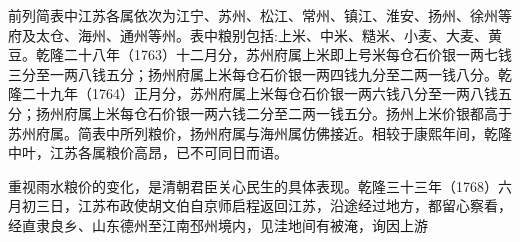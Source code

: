 

前列简表中江苏各属依次为江宁、苏州、松江、常州、镇江、淮安、扬州、徐州等府及太仓、海州、通州等州。表中粮别包括:上米、中米、糙米、小麦、大麦、黄豆。乾隆二十八年（1763）十二月分，苏州府属上米即上号米每仓石价银一两七钱三分至一两八钱五分；扬州府属上米每仓石价银一两四钱九分至二两一钱八分。乾隆二十九年（1764）正月分，苏州府属上米每仓石价银一两六钱八分至一两八钱五分；扬州府属上米每仓石价银一两六钱二分至二两一钱五分。扬州上米价银都高于苏州府属。简表中所列粮价，扬州府属与海州属仿佛接近。相较于康熙年间，乾隆中叶，江苏各属粮价高昂，已不可同日而语。

重视雨水粮价的变化，是清朝君臣关心民生的具体表现。乾隆三十三年（1768）六月初三日，江苏布政使胡文伯自京师启程返回江苏，沿途经过地方，都留心察看，经直隶良乡、山东德州至江南邳州境内，见洼地间有被淹，询因上游


